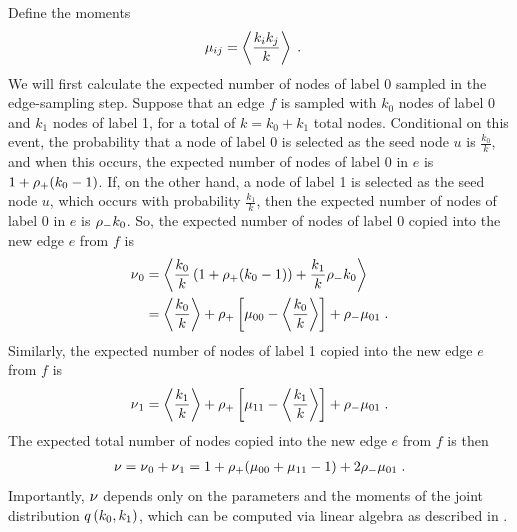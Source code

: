 \documentclass[aps,pre,reprint,superscriptaddress,nofootinbib]{revtex4-2}
\begin{document}
    Define the moments 
    \begin{align}
        \mu_{ij} &= \left\langle \frac{k_i k_j}{k} \right\rangle \;. 
    \end{align}
    We will first calculate the expected number of nodes of label 0 sampled in the edge-sampling step.
    Suppose that an edge $f$ is sampled with $k_0$ nodes of label 0 and $k_1$ nodes of label 1, for a total of $k = k_0 + k_1$ total nodes. 
    Conditional on this event, the probability that a node of label 0 is selected as the seed node $u$ is $\frac{k_0}{k}$, and when this occurs, the expected number of nodes of label 0 in $e$ is $1 + \rho{}_+ (k_0 - 1)$. 
    If, on the other hand, a node of label 1 is selected as the seed node $u$, which occurs with probability $\frac{k_1}{k}$, then the expected number of nodes of label 0 in $e$ is $\rho{}_- k_0$. 
    So, the expected number of nodes of label 0 copied into the new edge $e$ from $f$ is 
    \begin{align}
        \nu{}_0 &= \left\langle \frac{k_0}{k}\left( 1 + \rho{}_+(k_0 - 1) \right) + \frac{k_1}{k} \rho{}_- k_0 \right\rangle \\ 
        &= \left\langle \frac{k_0}{k} \right\rangle + \rho{}_+ \left[ \mu_{00} - \left\langle \frac{k_0}{k} \right\rangle \right] + \rho{}_- \mu_{01}\;. 
    \end{align}
    Similarly, the expected number of nodes of label 1 copied into the new edge $e$ from $f$ is 
    \begin{align}
        \nu{}_1 = \left\langle \frac{k_1}{k} \right\rangle + \rho{}_+ \left[ \mu_{11} - \left\langle \frac{k_1}{k} \right\rangle \right] + \rho{}_- \mu_{01}\;. 
    \end{align}
    The expected total number of nodes copied into the new edge $e$ from $f$ is then
    \begin{align}
        \nu{} = \nu{}_0 + \nu{}_1 = 1 + \rho{}_+(\mu_{00} + \mu_{11} - 1) + 2\rho{}_- \mu_{01}\;.
    \end{align}
    Importantly, $\nu{}$ depends only on the parameters and the moments of the joint distribution $q \left( k_0,k_1 \right)$, which can be computed via linear algebra as described in .
\end{document}
